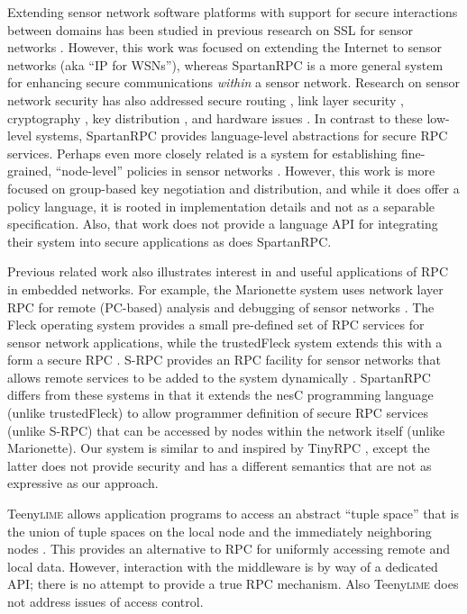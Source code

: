 Extending sensor network software platforms with support for secure interactions between domains
has been studied in previous research on SSL for sensor networks \cite{10.1109/WAINA.2009.47}.
However, this work was focused on extending the Internet to sensor networks (aka ``IP for
WSNs''), whereas SpartanRPC is a more general system for enhancing secure communications
\emph{within} a sensor network. Research on sensor network security has also addressed secure
routing \cite{senroute-ahnj03}, link layer security \cite{karlog-tinysec-2004}, cryptography
\cite{bertoni-2006}, key distribution \cite{camtepe-bulent-05}, and hardware issues
\cite{perrig-2004}. In contrast to these low-level systems, SpartanRPC provides language-level
abstractions for secure RPC services. Perhaps even more closely related is a system for
establishing fine-grained, ``node-level'' policies in sensor networks
\cite{Claycomb:2011:NNL:1889383.1889450}. However, this work is more focused on group-based key
negotiation and distribution, and while it does offer a policy language, it is rooted in
implementation details and not as a separable specification. Also, that work does not provide a
language API for integrating their system into secure applications as does SpartanRPC.

Previous related work also illustrates interest in and useful applications of RPC in embedded
networks. For example, the Marionette system uses network layer RPC for remote (PC-based)
analysis and debugging of sensor networks \cite{whitehouse-marionette-2006}. The Fleck operating
system provides a small pre-defined set of RPC services for sensor network applications, while
the trustedFleck system extends this with a form a secure RPC
\cite{hu-secfleck-2009,Hu:2010:TTW:1806895.1806900}. S-RPC provides an RPC facility for sensor
networks that allows remote services to be added to the system dynamically \cite{5766863}.
SpartanRPC differs from these systems in that it extends the nesC programming language (unlike
trustedFleck) to allow programmer definition of secure RPC services (unlike S-RPC) that can be
accessed by nodes within the network itself (unlike Marionette). Our system is similar to and
inspired by TinyRPC \cite{may-tinyrpc-2007}, except the latter does not provide security and has
a different semantics that are not as expressive as our approach.

Teeny\textsc{lime} allows application programs to access an abstract ``tuple space'' that is the
union of tuple spaces on the local node and the immediately neighboring nodes
\cite{Costa:2007:PWS:1516124.1516153}. This provides an alternative to RPC for uniformly
accessing remote and local data. However, interaction with the middleware is by way of a
dedicated API; there is no attempt to provide a true RPC mechanism. Also Teeny\textsc{lime} does
not address issues of access control.

